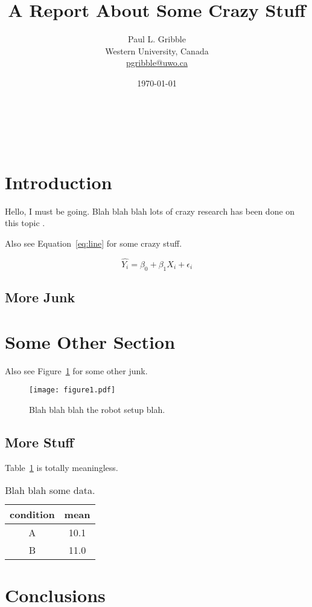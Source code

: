 \documentclass[letterpaper,titlepage,11pt]{article}
\title{A Report About Some Crazy Stuff}
\author{Paul L. Gribble\\Western University, Canada\\{\small \url{pgribble@uwo.ca}}}
\date{\today}
\makeatletter
\renewcommand{\maketitle}{
\begin{flushleft}          %
{\LARGE\@title}            %
\vspace{20pt}\\            %
{\large\@author}           %
\\\@date                   %
\vspace{20pt}              %
\end{flushleft}
}
\makeatother
\begin{document}
\maketitle
\thispagestyle{empty}

\section{Introduction}

Hello, I must be going. Blah blah blah lots of crazy research has been done on this topic \citep{Mattar:2005}. \lipsum[1]

\lipsum[1]

Also see Equation~\ref{eq:line} for some crazy stuff.

\begin{equation}
\hat{Y_{i}} = \beta_{0} + \beta_{1} X_{i} + \epsilon_{i}
\label{eq:line}
\end{equation}

\lipsum[1]

\subsection{More Junk}

\lipsum[1-3]

\section{Some Other Section}

Also see Figure~\ref{fig:setupfig} for some other junk.

\begin{figure}[H]
	\centering
    \texttt{[image: figure1.pdf]}
 \caption{Blah blah blah the robot setup blah.}
 \label{fig:setupfig}
\end{figure}

\lipsum[1-4]

\subsection{More Stuff}

Table~\ref{tbl:somedata} is totally meaningless.

\begin{table}[H]
	\centering
	\begin{tabular}{c|c}
		condition &mean\\
		\hline\hline
		A         &10.1\\
		B         &11.0\\
	\end{tabular}
 \caption{Blah blah some data.}
 \label{tbl:somedata}
\end{table}

\lipsum[1-2]

\section{Conclusions}

\lipsum[1-2]

 

\end{document}
